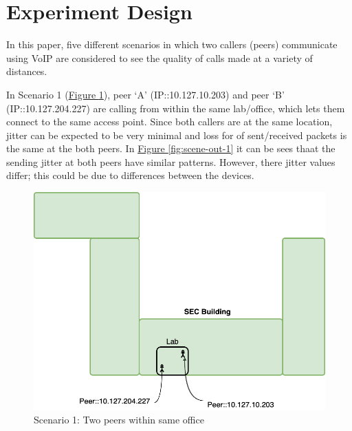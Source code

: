 \section{Experiment Design}	\label{sec:experiments}
	In this paper, five different scenarios in which two callers (peers) communicate using VoIP are considered to see the quality of calls made at a variety of distances. 
	
	In Scenario 1 (\hyperref[fig:scene-1]{Figure \ref{fig:scene-1}}), peer `A' (IP::10.127.10.203) and peer `B' (IP::10.127.204.227) are calling from within the same lab/office, which lets them connect to the same access point. Since both callers are at the same location, jitter can be expected to be very minimal and loss for of sent/received packets is the same at the both peers. In \hyperref[fig:scene-out-1]{Figure \ref{fig:scene-out-1}} it can be sees thaat the sending jitter at both peers have similar patterns. However, there jitter values differ; this could be due to differences between the devices. 
	\begin{figure}[tbh]
		\begin{minipage}{\textwidth}
			\includegraphics[scale=0.29]{Images/experiment/senarios/in_lab.drawio.png}
		\end{minipage}
		\caption{Scenario 1: Two peers within same office}
		\label{fig:scene-1}
	\end{figure}


